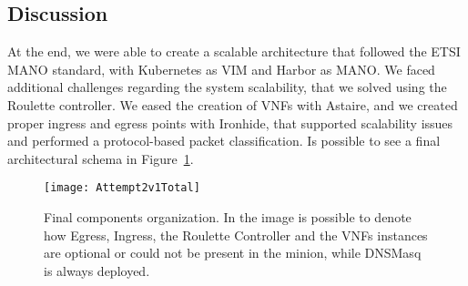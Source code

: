 \subsection{Discussion}
At the end, we were able to create a scalable architecture that followed the
ETSI MANO standard, with Kubernetes as VIM and Harbor as MANO. We faced
additional challenges regarding the system scalability, that we solved using the
Roulette controller. We eased the creation of VNFs with Astaire, and we created
proper ingress and egress points with Ironhide, that supported scalability
issues and performed a protocol-based packet classification. Is possible to see
a final architectural schema in
Figure~\ref{chap:archimpl:sec:secondattempt:img:attempt2v1total}.

\begin{figure}[t]
  \centering
  \texttt{[image: Attempt2v1Total]}
  \caption[Final components organization]{Final components organization. In the
    image is possible to denote how Egress, Ingress, the Roulette Controller and
    the VNFs instances are optional or could not be present in the minion, while
    DNSMasq is always deployed.}
  \label{chap:archimpl:sec:secondattempt:img:attempt2v1total}
\end{figure}
